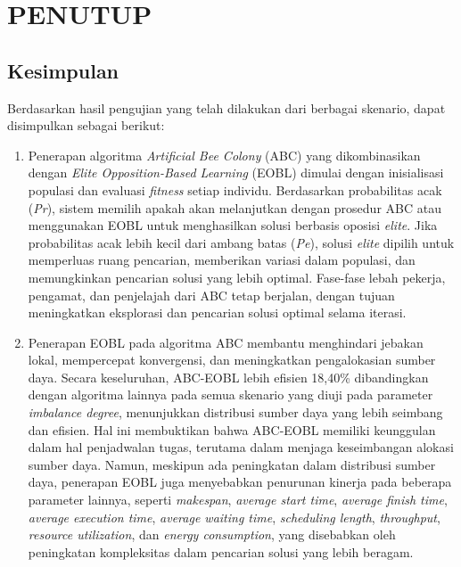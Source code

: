 \chapter{PENUTUP}

\section{Kesimpulan}
Berdasarkan hasil pengujian yang telah dilakukan dari berbagai skenario, dapat disimpulkan sebagai berikut:
\begin{enumerate} [nolistsep]
\item Penerapan algoritma \textit{Artificial Bee Colony} (ABC) yang dikombinasikan dengan \textit{Elite Opposition-Based Learning} (EOBL) dimulai dengan inisialisasi populasi dan evaluasi \textit{fitness} setiap individu. Berdasarkan probabilitas acak (\textit{Pr}), sistem memilih apakah akan melanjutkan dengan prosedur ABC atau menggunakan EOBL untuk menghasilkan solusi berbasis oposisi \textit{elite}. Jika probabilitas acak lebih kecil dari ambang batas (\textit{Pe}), solusi \textit{elite} dipilih untuk memperluas ruang pencarian, memberikan variasi dalam populasi, dan memungkinkan pencarian solusi yang lebih optimal. Fase-fase lebah pekerja, pengamat, dan penjelajah dari ABC tetap berjalan, dengan tujuan meningkatkan eksplorasi dan pencarian solusi optimal selama iterasi.

\item Penerapan EOBL pada algoritma ABC membantu menghindari jebakan lokal, mempercepat konvergensi, dan meningkatkan pengalokasian sumber daya. Secara keseluruhan, ABC-EOBL lebih efisien 18,40\% dibandingkan dengan algoritma lainnya pada semua skenario yang diuji pada parameter \textit{imbalance degree}, menunjukkan distribusi sumber daya yang lebih seimbang dan efisien. Hal ini membuktikan bahwa ABC-EOBL memiliki keunggulan dalam hal penjadwalan tugas, terutama dalam menjaga keseimbangan alokasi sumber daya. Namun, meskipun ada peningkatan dalam distribusi sumber daya, penerapan EOBL juga menyebabkan penurunan kinerja pada beberapa parameter lainnya, seperti \textit{makespan}, \textit{average start time}, \textit{average finish time}, \textit{average execution time}, \textit{average waiting time}, \textit{scheduling length}, \textit{throughput}, \textit{resource utilization}, dan \textit{energy consumption}, yang disebabkan oleh peningkatan kompleksitas dalam pencarian solusi yang lebih beragam.
\end{enumerate}

